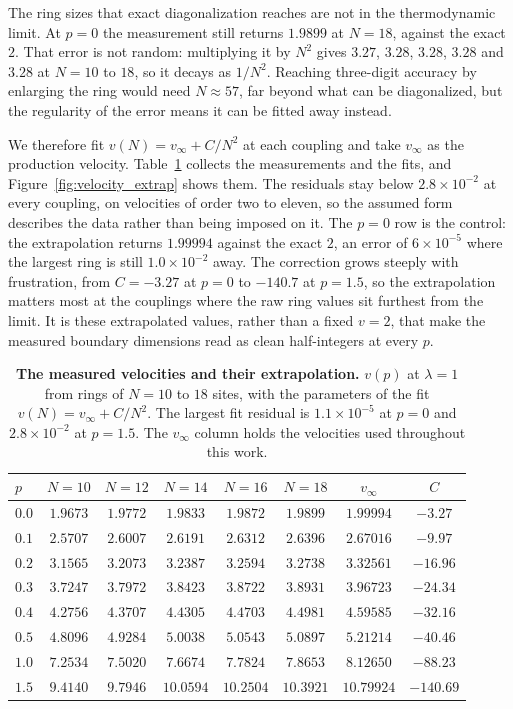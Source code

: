 The ring sizes that exact diagonalization reaches are not in the thermodynamic limit. At $p=0$ the measurement still returns $1.9899$ at $N=18$, against the exact $2$. That error is not random: multiplying it by $N^2$ gives $3.27$, $3.28$, $3.28$, $3.28$ and $3.28$ at $N=10$ to $18$, so it decays as $1/N^2$. Reaching three-digit accuracy by enlarging the ring would need $N\approx57$, far beyond what can be diagonalized, but the regularity of the error means it can be fitted away instead.

We therefore fit $v(N)=v_\infty + C/N^2$ at each coupling and take $v_\infty$ as the production velocity. Table~\ref{tab:velocity} collects the measurements and the fits, and Figure~\ref{fig:velocity_extrap} shows them. The residuals stay below $2.8\times10^{-2}$ at every coupling, on velocities of order two to eleven, so the assumed form describes the data rather than being imposed on it. The $p=0$ row is the control: the extrapolation returns $1.99994$ against the exact $2$, an error of $6\times10^{-5}$ where the largest ring is still $1.0\times10^{-2}$ away. The correction grows steeply with frustration, from $C=-3.27$ at $p=0$ to $-140.7$ at $p=1.5$, so the extrapolation matters most at the couplings where the raw ring values sit furthest from the limit. It is these extrapolated values, rather than a fixed $v=2$, that make the measured boundary dimensions read as clean half-integers at every $p$.

\begin{table}[htbp]
  \centering
  \begin{tabular}{lccccccc}
    \hline
    $p$ & $N=10$ & $N=12$ & $N=14$ & $N=16$ & $N=18$ & $v_\infty$ & $C$ \\
    \hline
    $0.0$ & $1.9673$ & $1.9772$ & $1.9833$ & $1.9872$ & $1.9899$ & $1.99994$ & $-3.27$ \\
    $0.1$ & $2.5707$ & $2.6007$ & $2.6191$ & $2.6312$ & $2.6396$ & $2.67016$ & $-9.97$ \\
    $0.2$ & $3.1565$ & $3.2073$ & $3.2387$ & $3.2594$ & $3.2738$ & $3.32561$ & $-16.96$ \\
    $0.3$ & $3.7247$ & $3.7972$ & $3.8423$ & $3.8722$ & $3.8931$ & $3.96723$ & $-24.34$ \\
    $0.4$ & $4.2756$ & $4.3707$ & $4.4305$ & $4.4703$ & $4.4981$ & $4.59585$ & $-32.16$ \\
    $0.5$ & $4.8096$ & $4.9284$ & $5.0038$ & $5.0543$ & $5.0897$ & $5.21214$ & $-40.46$ \\
    $1.0$ & $7.2534$ & $7.5020$ & $7.6674$ & $7.7824$ & $7.8653$ & $8.12650$ & $-88.23$ \\
    $1.5$ & $9.4140$ & $9.7946$ & $10.0594$ & $10.2504$ & $10.3921$ & $10.79924$ & $-140.69$ \\
    \hline
  \end{tabular}
  \caption{\textbf{The measured velocities and their extrapolation.} $v(p)$ at $\lambda=1$ from rings of $N=10$ to $18$ sites, with the parameters of the fit $v(N)=v_\infty+C/N^2$. The largest fit residual is $1.1\times10^{-5}$ at $p=0$ and $2.8\times10^{-2}$ at $p=1.5$. The $v_\infty$ column holds the velocities used throughout this work.}
  \label{tab:velocity}
\end{table}

